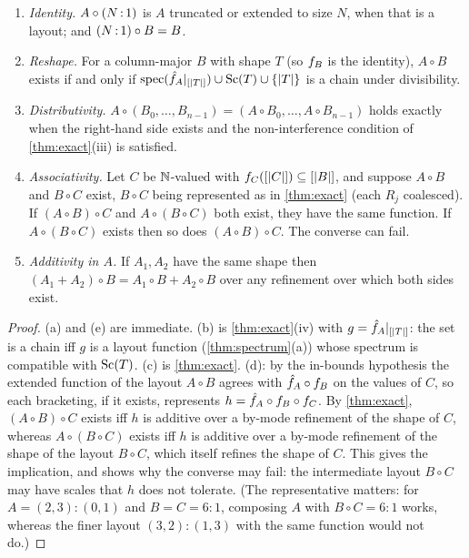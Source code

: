 \begin{proposition}\label{prop:laws}
\begin{enumerate}[label=(\alph*),itemsep=1pt]
\item \emph{Identity.} $A\circ(N\,{:}\,1)$ is $A$ truncated or extended to size $N$, when that is
 a layout; and $(N\,{:}\,1)\circ B=B$.
\item \emph{Reshape.} For a column-major $B$ with shape $T$ (so $f_{B}$ is the identity),
 $A\circ B$ exists if and only if $\operatorname{spec}(\hat{f}_{A}|_{[|T|]})\cup\operatorname{Sc}(T)\cup\{|T|\}$ is a chain
 under divisibility.
\item \emph{Distributivity.} $A\circ(B_0,\dots,B_{n-1})=(A\circ B_0,\dots,A\circ B_{n-1})$ holds
 exactly when the right-hand side exists and the non-interference condition of
 \cref{thm:exact}(iii) is satisfied.
\item \emph{Associativity.} Let $C$ be $\mathbb{N}$-valued with $f_{C}([|C|])\subseteq[|B|]$, and
 suppose $A\circ B$ and $B\circ C$ exist, $B\circ C$ being represented as in \cref{thm:exact}
 (each $R_j$ coalesced). If $(A\circ B)\circ C$ and $A\circ(B\circ C)$ both
 exist, they have the same function. If $A\circ(B\circ C)$ exists then so does
 $(A\circ B)\circ C$. The converse can fail.
\item \emph{Additivity in $A$.} If $A_1,A_2$ have the same shape then
 $(A_1+A_2)\circ B=A_1\circ B+A_2\circ B$ over any refinement over which both sides exist.
\end{enumerate}
\end{proposition}
\begin{proof}
(a) and (e) are immediate. (b) is \cref{thm:exact}(iv) with $g=\hat{f}_{A}|_{[|T|]}$: the set is
a chain iff $g$ is a layout function (\cref{thm:spectrum}(a)) whose spectrum is compatible with
$\operatorname{Sc}(T)$. (c) is \cref{thm:exact}. (d): by the in-bounds hypothesis the extended function of the
layout $A\circ B$ agrees with $\hat{f}_{A}\circ f_{B}$ on the values of $C$, so each bracketing, if it
exists, represents $h=\hat{f}_{A}\circ f_{B}\circ f_{C}$. By \cref{thm:exact}, $(A\circ B)\circ C$
exists iff $h$ is additive over a by-mode refinement of the shape of $C$, whereas
$A\circ(B\circ C)$ exists iff $h$ is additive over a by-mode refinement of the shape of the
layout $B\circ C$, which itself refines the shape of $C$. This gives the implication, and shows
why the converse may fail: the intermediate layout $B\circ C$ may have scales that $h$ does not
tolerate. (The representative matters: for $A=(2,3):(0,1)$ and $B=C=6:1$, composing $A$ with
$B\circ C=6:1$ works, whereas the finer layout $(3,2):(1,3)$ with the same function would not
do.)
\end{proof}

